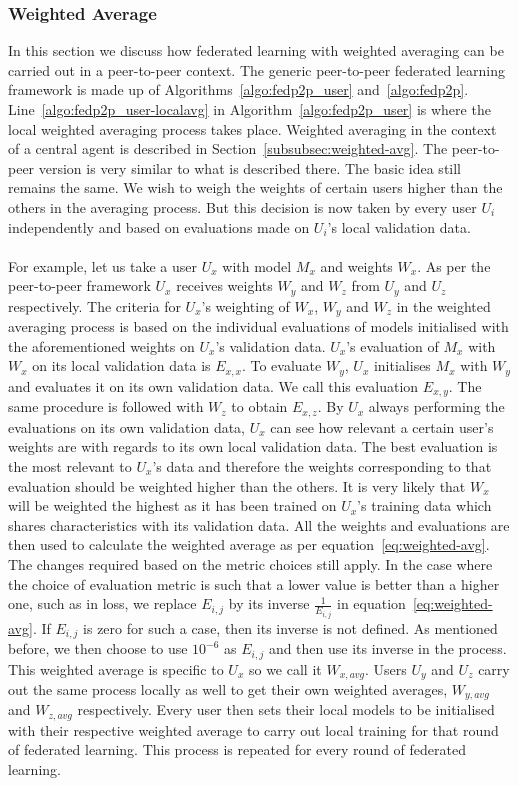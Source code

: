 \documentclass[12pt]{article}
\begin{document}
\subsubsection{Weighted Average}
In this section we discuss how federated learning with weighted averaging can be carried out in a peer-to-peer context. The generic peer-to-peer federated learning framework is made up of Algorithms~\ref{algo:fedp2p_user} and~\ref{algo:fedp2p}. Line~\ref{algo:fedp2p_user-localavg} in Algorithm~\ref{algo:fedp2p_user} is where the local weighted averaging process takes place. Weighted averaging in the context of a central agent is described in Section~\ref{subsubsec:weighted-avg}. The peer-to-peer version is very similar to what is described there. The basic idea still remains the same. We wish to weigh the weights of certain users higher than the others in the averaging process. But this decision is now taken by every user $U_i$ independently and based on evaluations made on $U_i$'s local validation data.
\\\\
For example, let us take a user $U_x$ with model $M_x$ and weights $W_x$. As per the peer-to-peer framework $U_x$ receives weights $W_y$ and $W_z$ from $U_y$ and $U_z$ respectively. The criteria for $U_x$'s weighting of $W_x$, $W_y$ and $W_z$ in the weighted averaging process is based on the individual evaluations of models initialised with the aforementioned weights on $U_x$'s validation data. $U_x$'s evaluation of $M_x$ with $W_x$ on its local validation data is $E_{x,x}$. To evaluate $W_y$, $U_x$ initialises $M_x$ with $W_y$ and evaluates it on its own validation data. We call this evaluation $E_{x,y}$. The same procedure is followed with $W_z$ to obtain $E_{x,z}$. By $U_x$ always performing the evaluations on its own validation data, $U_x$ can see how relevant a certain user's weights are with regards to its own local validation data. The best evaluation is the most relevant to $U_x$'s data and therefore the weights corresponding to that evaluation should be weighted higher than the others. It is very likely that $W_x$ will be weighted the highest as it has been trained on $U_x$'s training data which shares characteristics with its validation data. All the weights and evaluations are then used to calculate the weighted average as per equation~\ref{eq:weighted-avg}. The changes required based on the metric choices still apply. In the case where the choice of evaluation metric is such that a lower value is better than a higher one, such as in loss, we replace $E_{i,j}$ by its inverse $\frac{1}{E_{i,j}}$ in equation~\ref{eq:weighted-avg}. If $E_{i,j}$ is zero for such a case, then its inverse is not defined. As mentioned before, we then choose to use $10^{-6}$ as $E_{i,j}$ and then use its inverse in the process. This weighted average is specific to $U_x$ so we call it $W_{x, avg}$. Users $U_y$ and $U_z$ carry out the same process locally as well to get their own weighted averages, $W_{y, avg}$ and $W_{z, avg}$ respectively. Every user then sets their local models to be initialised with their respective weighted average to carry out local training for that round of federated learning. This process is repeated for every round of federated learning.
\end{document}
